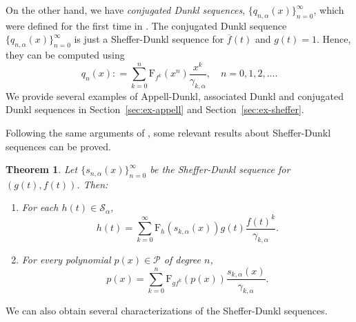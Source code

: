 \documentclass[11pt]{article}
\theoremstyle{plain}
\newtheorem{theorem}{Theorem}[section]
\theoremstyle{remark}
\numberwithin{equation}{section} %
\newcommand{\calP}{\mathcal{P}}
\newcommand{\Sa}{\mathcal{S}_{\alpha}}
\newcommand{\FF}{\mathrm{F}}
\begin{document}
On the other hand, we have \textit{conjugated Dunkl sequences}, $\{q_{n,\alpha}(x)\}_{n=0}^{\infty}$, which were defined for the first time in \cite{RomRot}. The conjugated Dunkl sequence $\{q_{n,\alpha}(x)\}_{n=0}^{\infty}$ is just a Sheffer-Dunkl sequence for $\overline{f}(t)$ and $g(t) = 1$. Hence, they can be computed using
\begin{equation}
\label{def:conj-seq}
q_n(x) : = \sum_{k=0}^n {\FF_{f^k}(x^n)} \frac{x^k}{\gamma_{k,\alpha}},
\quad n= 0,1,2,\dots.
\end{equation}
We provide several examples of Appell-Dunkl, associated Dunkl and conjugated Dunkl sequences in Section~\ref{sec:ex-appell} and Section~\ref{sec:ex-sheffer}.

Following the same arguments of \cite[Chapter~2, \S\,3]{Rom}, some relevant results about Sheffer-Dunkl sequences can be proved. 

\begin{theorem}
\label{thm:expan-oper}
Let $\{s_{n,\alpha}(x)\}_{n=0}^{\infty}$ be the Sheffer-Dunkl sequence for $(g(t),f(t))$. Then:
\begin{enumerate}
\item For each $h(t) \in \Sa$,
\[
h(t) = \sum_{k=0}^{\infty} {\FF_h(s_{k,\alpha}(x))} g(t) \frac{f(t)^k}{\gamma_{k,\alpha}}.
\]
\item For every polynomial $p(x) \in \calP$ of degree $n$, 
\[
p(x) = \sum_{k=0}^n \FF_{gf^k}(p(x)) \frac{s_{k,\alpha}(x)}{\gamma_{k,\alpha}}.
\] 
\end{enumerate}
\end{theorem}

We can also obtain several characterizations of the Sheffer-Dunkl sequences. 
\end{document}
